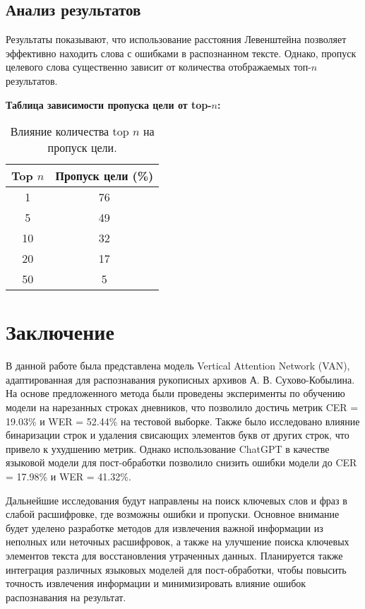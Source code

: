 \documentclass{article}
\begin{document}
\subsection{Анализ результатов}
Результаты показывают, что использование расстояния Левенштейна позволяет эффективно находить слова с ошибками в распознанном тексте. Однако, пропуск целевого слова существенно зависит от количества отображаемых топ-$n$ результатов.

\textbf{Таблица зависимости пропуска цели от top-$n$:}
\begin{table}[h!]
        \centering
        \begin{tabular}{|c|c|}
            \hline
            \textbf{Top $n$} & \textbf{Пропуск цели (\%)} \\
            \hline
            1 & 76 \\
            5 & 49 \\
            10 & 32 \\
            20 & 17 \\
            50 & 5 \\
            \hline
        \end{tabular}
        \caption{Влияние количества top $n$ на пропуск цели.}
    \end{table}

\section{Заключение}

В данной работе была представлена модель Vertical Attention Network (VAN), адаптированная для распознавания рукописных архивов А. В. Сухово-Кобылина. На основе предложенного метода были проведены эксперименты по обучению модели на нарезанных строках дневников, что позволило достичь метрик CER = 19.03\% и WER = 52.44\% на тестовой выборке. Также было исследовано влияние бинаризации строк и удаления свисающих элементов букв от других строк, что привело к ухудшению метрик. Однако использование ChatGPT в качестве языковой модели для пост-обработки позволило снизить ошибки модели до CER = 17.98\% и WER = 41.32\%.

Дальнейшие исследования будут направлены на поиск ключевых слов и фраз в слабой расшифровке, где возможны ошибки и пропуски. Основное внимание будет уделено разработке методов для извлечения важной информации из неполных или неточных расшифровок, а также на улучшение поиска ключевых элементов текста для восстановления утраченных данных. Планируется также интеграция различных языковых моделей для пост-обработки, чтобы повысить точность извлечения информации и минимизировать влияние ошибок распознавания на результат.
\end{document}
